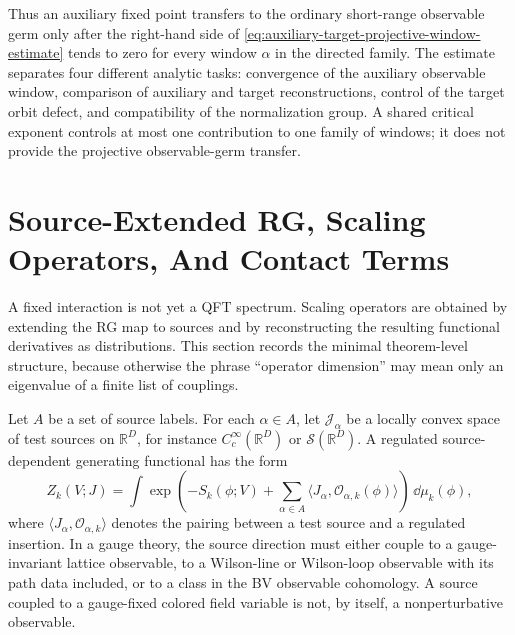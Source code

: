 Thus an auxiliary fixed point transfers to the ordinary short-range
observable germ only after the right-hand side of
\eqref{eq:auxiliary-target-projective-window-estimate} tends to zero for
every window \(\alpha\) in the directed family.  The estimate separates four
different analytic tasks: convergence of the auxiliary observable window,
comparison of auxiliary and target reconstructions, control of the target
orbit defect, and compatibility of the normalization group.  A shared
critical exponent controls at most one contribution to one family of
windows; it does not provide the projective observable-germ transfer.

\section{Source-Extended RG, Scaling Operators, And Contact Terms}

A fixed interaction is not yet a QFT spectrum.  Scaling operators are
obtained by extending the RG map to sources and by reconstructing the
resulting functional derivatives as distributions.  This section records the
minimal theorem-level structure, because otherwise the phrase ``operator
dimension'' may mean only an eigenvalue of a finite list of couplings.

Let \(A\) be a set of source labels.  For each \(\alpha\in A\), let
\(\mathcal J_\alpha\) be a locally convex space of test sources on
\(\mathbb R^D\), for instance \(C_c^\infty(\mathbb R^D)\) or
\(\mathcal S(\mathbb R^D)\).  A regulated source-dependent generating
functional has the form
\begin{equation}
  Z_k(V;J)
  =
  \int
  \exp\!\left(
    -S_k(\phi;V)
    +\sum_{\alpha\in A}\langle J_\alpha,\mathcal O_{\alpha,k}(\phi)\rangle
  \right)\,\dd\mu_k(\phi),
  \label{eq:source-extended-rg-generating-functional}
\end{equation}
where \(\langle J_\alpha,\mathcal O_{\alpha,k}\rangle\) denotes the pairing
between a test source and a regulated insertion.  In a gauge theory, the
source direction must either couple to a gauge-invariant lattice observable,
to a Wilson-line or Wilson-loop observable with its path data included, or
to a class in the BV observable cohomology.  A source coupled to a
gauge-fixed colored field variable is not, by itself, a nonperturbative
observable.

